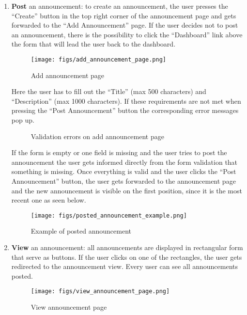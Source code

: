 \documentclass[conference]{IEEEtran}
\begin{document}
\begin{enumerate}
    \item \textbf{Post} an announcement: to create an announcement, the user presses the “Create” button in the top right corner of the announcement page and gets forwarded to the “Add Announcement” page. If the user decides not to post an announcement, there is the possibility to click the “Dashboard” link above the form that will lead the user back to the dashboard.
    \begin{figure}[H]
    \centering
    \texttt{[image: figs/add\_announcement\_page.png]}
    \caption{Add announcement page}
    \label{fig:Add announcement page}
    \end{figure}
    Here the user has to fill out the “Title” (max 500 characters) and “Description” (max 1000 characters). If these requirements are not met when pressing the “Post Announcement” button the corresponding error messages pop up.
    \begin{figure}[H]
    \centering
    \caption{Validation errors on add announcement page}
    \label{fig:Validation errors on add announcement page}
    \end{figure}
    If the form is empty or one field is missing and the user tries to post the announcement the user gets informed directly from the form validation that something is missing. Once everything is valid and the user clicks the “Post Announcement” button, the user gets forwarded to the announcement page and the new announcement is visible on the first position, since it is the most recent one as seen below.
    \begin{figure}[H]
    \centering
    \texttt{[image: figs/posted\_announcement\_example.png]}
    \caption{Example of posted announcement}
    \label{fig:Example of posted announcement}
    \end{figure}
    \item \textbf{View} an announcement: all announcements are displayed in rectangular form that serve as buttons. If the user clicks on one of the rectangles, the user gets redirected to the announcement view. Every user can see all announcements posted.
    \begin{figure}[H]
    \centering
    \texttt{[image: figs/view\_announcement\_page.png]}
    \caption{View announcement page}
    \label{fig:View announcement page}

\end{figure}
\end{enumerate}
\end{document}
